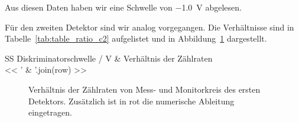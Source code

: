 \documentclass[11pt, ngerman, fleqn, DIV=15, headinclude, BCOR=2cm]{scrreprt}
\begin{document}
Aus diesen Daten haben wir eine Schwelle von \SI{-1.0}{\volt} abgelesen.

Für den zweiten Detektor sind wir analog vorgegangen. Die Verhältnisse sind in
Tabelle~\ref{tab:table_ratio_c2} aufgelistet und in
Abbildung~\ref{fig:ratio-data-c2} dargestellt.

\begin{table}[htbp]
    \centering
        \begin{tabular}{SS}
            {Diskriminatorschwelle / \si\volt} & {Verhältnis der Zählraten} \\
            \midrule
            << ' & '.join(row) >> \\
        \end{tabular}
    \caption{%
        Diskriminatorschwellen und Verhältnis der Zählraten für den zweiten
        Detektor.
    }
    \label{tab:table_ratio_c2}
\end{table}


\begin{figure}[htbp]
    \centering
    \caption{%
        Verhältnis der Zählraten von Mess- und Monitorkreis des ersten
        Detektors. Zusätzlich ist in rot die numerische Ableitung eingetragen.
    }
    \label{fig:ratio-data-c2}
\end{figure}
\end{document}
